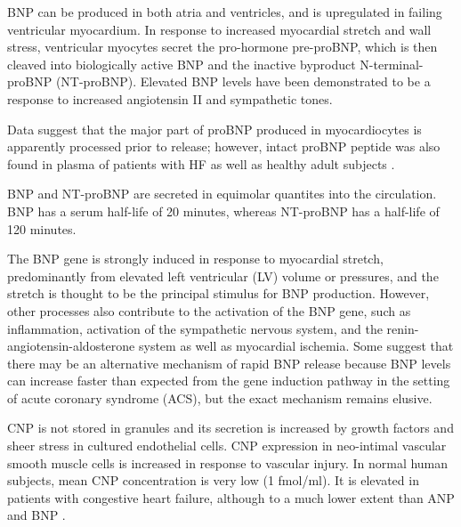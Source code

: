 \documentclass[14pt,a4paper,onecolumn]{extarticle}
\begin{document}


BNP can be produced in both atria and ventricles, and is upregulated in failing ventricular myocardium. In response to increased myocardial stretch and wall stress, ventricular myocytes secret the pro-hormone pre-proBNP, which is then cleaved into biologically active BNP and the inactive byproduct N-terminal-proBNP (NT-proBNP). Elevated BNP levels have been demonstrated to be a response to increased angiotensin II and sympathetic tones. \citep{Iwanaga2006} %

Data suggest that the major part of proBNP produced in myocardiocytes is apparently processed prior to release; however, intact proBNP peptide was also found in plasma of patients with HF as well as healthy adult subjects \citep{14}. %

BNP and NT-proBNP are secreted in equimolar quantites into the circulation.  BNP has a serum half-life of 20 minutes, whereas NT-proBNP has a half-life of 120 minutes. \citep{DanielsandMaisel2007} %

The BNP gene is strongly induced in response to myocardial stretch, predominantly from elevated left ventricular (LV) volume or pressures, and the stretch is thought to be the principal stimulus for BNP production. However, other processes also contribute to the activation of the BNP gene, such as inflammation, activation of the sympathetic nervous system, and the renin-angiotensin-aldosterone system as well as myocardial ischemia. Some suggest that there may be an alternative mechanism of rapid BNP release because BNP levels can increase faster than expected from the gene induction pathway in the setting of acute coronary syndrome (ACS), but the exact mechanism remains elusive. \citep{Gaggin2014} %

CNP is not stored in granules and its secretion is increased by growth factors and sheer stress in cultured endothelial cells. CNP expression in neo-intimal vascular smooth muscle cells is increased in response to vascular injury. In normal human subjects, mean CNP concentration is very low (1 fmol/ml). It is elevated in patients with congestive heart failure, although to a much lower extent than ANP and BNP \citep{Charles2006} \citep{Del-Ry2005} \citep{Kalra2003}. %
\end{document}
